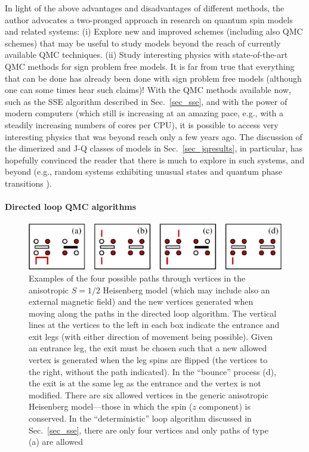 \documentclass[draft,numberedheadings]{aipproc}
\begin{document}
In light of the above advantages and disadvantages of different methods, the author advocates a two-pronged approach in research on 
quantum spin models and related systems: (i) Explore new and improved schemes (including also QMC schemes) that may be useful to study 
models beyond the reach of currently available QMC techniques. (ii) Study interesting physics with state-of-the-art QMC methods for sign 
problem free models. It is far from true that everything that can be done has already been done with sign problem free models (although 
one can some times hear such claims)! With the QMC methods available now, such as the SSE algorithm described in Sec.~\ref{sec_sse}, 
and with the power of modern computers (which still is increasing at an amazing pace, e.g., with a steadily increasing numbers of cores 
per CPU), it is possible to access very interesting physics that was beyond reach only a few years ago. The discussion of the dimerized
and J-Q classes of models in Sec.~\ref{sec_jqresults}, in particular, has hopefully convinced the reader that there is much to explore 
in such systems, and beyond (e.g., random systems exhibiting unusual states and quantum phase transitions 
\cite{dimdiluted,yu06,roscilde07,wangperc}). 

\paragraph{Directed loop QMC algorithms}

\begin{figure}
\includegraphics[width=11.25cm, clip]{vertpaths.eps}
\caption{Examples of the four possible paths through vertices in the anisotropic $S=1/2$ Heisenberg model (which may include also an external 
magnetic field) and the new vertices generated when moving along the paths in the directed loop algorithm. The vertical lines at the 
vertices to the left in each box indicate the entrance and exit legs (with either direction of movement being possible). Given an entrance 
leg, the exit must be chosen such that a new allowed vertex is generated when the leg spins are flipped (the vertices to the right, 
without the path indicated). In the ``bounce'' process (d), the exit is at the same leg as the entrance and the vertex is not modified. 
There are six allowed vertices in the generic anisotropic Heisenberg model---those in which the spin ($z$ component) is conserved. 
In the ``deterministic'' loop algorithm discussed in Sec.~\ref{sec_sse}, there are only four vertices and only paths of type (a) are allowed}
\label{vertpaths}
\end{figure}
\end{document}
